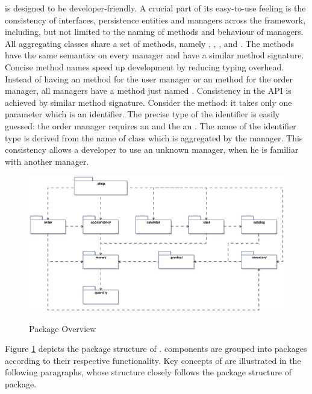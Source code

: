 \salespoint{} is designed to be developer-friendly.
A crucial part of its easy-to-use feeling is the consistency of interfaces, persistence entities and managers across the framework, including, but not limited to the naming of methods and behaviour of managers.
All aggregating classes share a set of methods, namely , , ,  and .
The methods have the same semantics on every manager and have a similar method signature.
Concise method names speed up development by reducing typing overhead.
Instead of having an  method for the user manager or an  method for the order manager, all managers have a method just named .
Consistency in the API is achieved by similar method signature.
Consider the  method: it takes only one parameter which is an identifier.
The precise type of the identifier is easily guessed: the order manager requires an  and the  an .
The name of the identifier type is derived from the name of class which is aggregated by the manager.
This consistency allows a developer to use an unknown manager, when he is familiar with another manager.
\\

\begin{figure}
	\centering
  \includegraphics[width=1.0\textwidth]{images/Package_Overview.eps}
	\label{package_overview}
	\caption{Package Overview}
\end{figure}

Figure \ref{package_overview} depicts the package structure of \salespoint{}.
\salespoint{} components are grouped into packages according to their respective functionality.
Key concepts of \salespoint{} are illustrated in the following paragraphs, whose structure closely follows the package structure of \salespoint{}  package.











